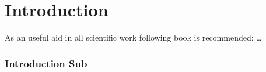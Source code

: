 \chapter{Introduction}
\label{sec:Introduction}

As an useful aid in all scientific work following book is recommended: \cite{deininger1992studienarbeiten}
\dots

\Blindtext

\subsection{Introduction Sub}
\Blindtext

\Blindtext